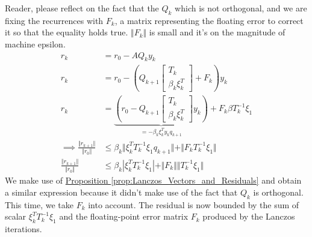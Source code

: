 \documentclass[]{article}
\theoremstyle{definition}
\begin{document}
            Reader, please reflect on the fact that the $Q_k$ which is not orthogonal, and we are fixing the recurrences with $F_k$, a matrix representing the floating error to correct it so that the equality holds true. $\Vert F_k\Vert$ is small and it's on the magnitude of machine epsilon. 
            \begin{align}
                r_k &= r_0 - AQ_ky_k
                \\
                r_k &= r_0 - 
                    \left(
                        Q_{k + 1} \begin{bmatrix}
                            T_k
                            \\
                            \beta_k \xi_k^T
                        \end{bmatrix}
                        + 
                        F_k
                    \right)
                y_k
                \\
                r_k &= 
                \underbrace{\left(
                    r_0 - Q_{k + 1}\begin{bmatrix}
                        T_k
                        \\
                        \beta_k \xi_k^T
                    \end{bmatrix}y_k
                \right)}_{= -\beta_k\xi_k^Ty_kq_{k + 1}} + F_k \beta T_k^{-1}\xi_1
                \\
                \implies
                \frac{\Vert r_{k + 1}\Vert}
                {
                    \Vert r_0\Vert
                } &\le
                \beta_k \Vert
                    \xi_k^T T_k^{-1}\xi_1 q_{k + 1}
                \Vert + 
                \Vert F_kT_k^{-1}\xi_1 \Vert
                \\
                \frac{\Vert r_{k + 1}\Vert}
                {
                    \Vert r_0\Vert
                } 
                &\le 
                \beta_k |
                    \xi_k^T T_k^{-1}\xi_1
                | + 
                \Vert F_k\Vert  \Vert T_k^{-1}\xi_1\Vert
            \end{align}
            We make use of \hyperref[prop:Lanczos_Vectors_and_Residuals]{Proposition \ref*{prop:Lanczos_Vectors_and_Residuals}} and obtain a similar expression because it didn't make use of the fact that $Q_k$ is orthogonal. This time, we take $F_k$ into account. The residual is now bounded by the sum of scalar $\xi_k^T T_k^{-1}\xi_1$ and the floating-point error matrix $F_k$ produced by the Lanczos iterations. 
\end{document}
